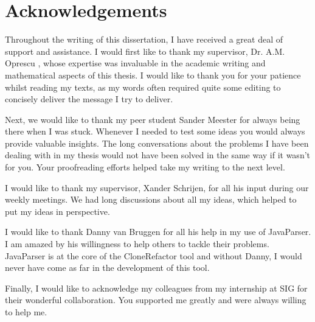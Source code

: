 \chapter*{Acknowledgements}
Throughout the writing of this dissertation, I have received a great deal of support and assistance. I would first like to thank my supervisor, Dr. A.M. Oprescu , whose expertise was invaluable in the academic writing and mathematical aspects of this thesis. I would like to thank you for your patience whilst reading my texts, as my words often required quite some editing to concisely deliver the message I try to deliver.

Next, we would like to thank my peer student Sander Meester for always being there when I was stuck. Whenever I needed to test some ideas you would always provide valuable insights. The long conversations about the problems I have been dealing with in my thesis would not have been solved in the same way if it wasn't for you. Your proofreading efforts helped take my writing to the next level.

I would like to thank my supervisor, Xander Schrijen, for all his input during our weekly meetings. We had long discussions about all my ideas, which helped to put my ideas in perspective.

I would like to thank Danny van Bruggen for all his help in my use of JavaParser. I am amazed by his willingness to help others to tackle their problems. JavaParser is at the core of the CloneRefactor tool and without Danny, I would never have come as far in the development of this tool.

Finally, I would like to acknowledge my colleagues from my internship at SIG for their wonderful collaboration. You supported me greatly and were always willing to help me.
